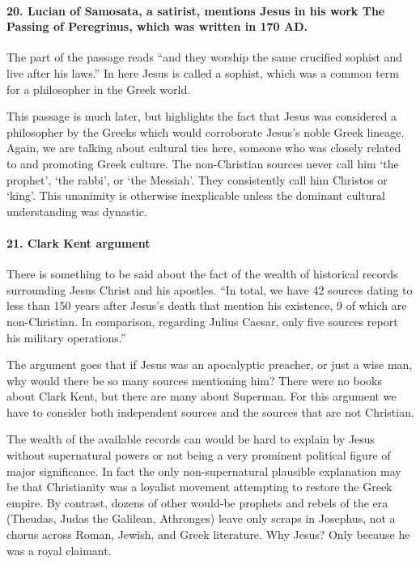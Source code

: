 \paragraph{20.
Lucian of Samosata, a satirist, mentions Jesus in his work The Passing of Peregrinus, which was written in 170 AD.}\label{par:lucian-of-samosata-a-satirist-mentions-jesus-in-his-work-the-passing-of-peregrinus-which-was-written-in-170-ad.}

The part of the passage reads ``and they worship the same crucified sophist and live after his laws.'' In here Jesus is called a sophist, which was a common term for a philosopher in the Greek world.

This passage is much later, but highlights the fact that Jesus was considered a philosopher by the Greeks which would corroborate Jesus's noble Greek lineage.
Again, we are talking about cultural ties here, someone who was closely related to and promoting Greek culture.
The non-Christian sources never call him ‘the prophet’, ‘the rabbi’, or ‘the Messiah’.
They consistently call him Christos or ‘king’.
This unanimity is otherwise inexplicable unless the dominant cultural understanding was dynastic.

\paragraph{21.
Clark Kent argument}\label{par:clark-kent-argument}

There is something to be said about the fact of the wealth of historical records surrounding Jesus Christ and his apostles.
``In total, we have 42 sources dating to less than 150 years after Jesus's death that mention his existence, 9 of which are non-Christian.
In comparison, regarding Julius Caesar, only five sources report his military operations.''

The argument goes that if Jesus was an apocalyptic preacher, or just a wise man, why would there be so many sources mentioning him?
There were no books about Clark Kent, but there are many about Superman.
For this argument we have to consider both independent sources and the sources that are not Christian.

The wealth of the available records can would be hard to explain by Jesus without supernatural powers or not being a very prominent political figure of major significance.
In fact the only non-supernatural plausible explanation may be that Christianity was a loyalist movement attempting to restore the Greek empire.
By contrast, dozens of other would-be prophets and rebels of the era (Theudas, Judas the Galilean, Athronges) leave only scraps in Josephus, not a chorus across Roman, Jewish, and Greek literature. Why Jesus? Only because he was a royal claimant.

